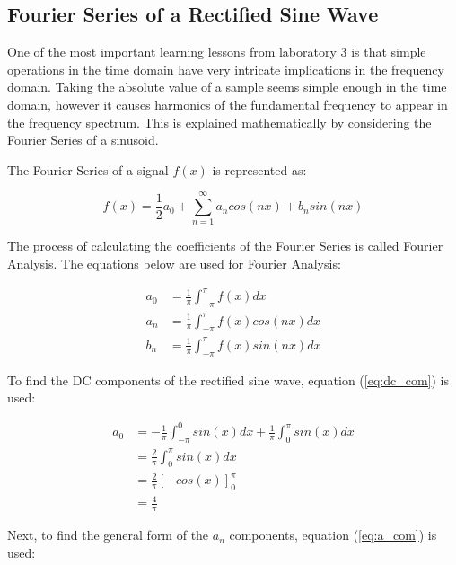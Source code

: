\documentclass{article}
\begin{document}
\subsection{Fourier Series of a Rectified Sine Wave}\label{sec:fourier_series_of_a_rectified_sine_wave}

One of the most important learning lessons from laboratory 3 is that simple operations in the time domain have very intricate implications in the frequency domain. Taking the absolute value of a sample seems simple enough in the time domain, however it causes harmonics of the fundamental frequency to appear in the frequency spectrum. This is explained mathematically by considering the Fourier Series of a sinusoid.

The Fourier Series of a signal $f(x)$ is represented as:

\begin{equation}
    f(x) = \frac{1}{2}a_{0} + \sum_{n=1}^{\infty}a_{n}cos(nx) + b_{n}sin(nx)
\end{equation}

The process of calculating the coefficients of the Fourier Series is called Fourier Analysis. The equations below are used for Fourier Analysis:

\begin{align}
    a_{0}   &= \frac{1}{\pi}\int_{-\pi}^{\pi}f(x)dx\label{eq:dc_com}\\ 
    a_{n}   &= \frac{1}{\pi}\int_{-\pi}^{\pi}f(x)cos(nx)dx\label{eq:a_com}\\ 
    b_{n}   &= \frac{1}{\pi}\int_{-\pi}^{\pi}f(x)sin(nx)dx \label{eq:b_com}
\end{align}

To find the DC components of the rectified sine wave, equation (\ref{eq:dc_com}) is used:

\begin{align}
    a_{0}   &= -\frac{1}{\pi}\int_{-\pi}^{0}sin(x)dx + \frac{1}{\pi}\int_{0}^{\pi}sin(x)dx\\
            &= \frac{2}{\pi}\int_{0}^{\pi}sin(x)dx\\
            &= \frac{2}{\pi}\left[-cos(x)\right]_{0}^{\pi}\\
            &= \frac{4}{\pi}
\end{align}

Next, to find the general form of the $a_{n}$ components, equation (\ref{eq:a_com}) is used:
\end{document}
